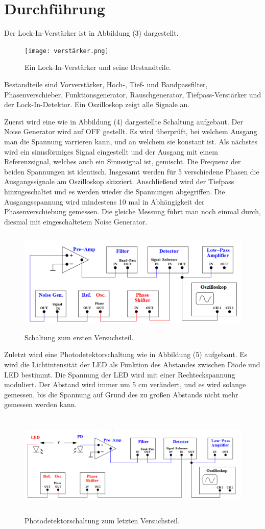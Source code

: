\section{Durchführung}
\label{sec:Durchführung}

Der Lock-In-Verstärker ist in Abbildung (3) dargestellt.

\begin{figure}[H]
  \centering
  \texttt{[image: verstärker.png]}
  \caption{Ein Lock-In-Verstärker und seine Bestandteile.  \cite[S. 3]{l}}
\end{figure}

\noindent Bestandteile sind Vorverstärker, Hoch-, Tief- und Bandpassfilter, Phasenverschieber, Funktionsgenerator, Rauschgenerator, Tiefpass-Verstärker und der Lock-In-Detektor.
Ein Oszilloskop zeigt alle Signale an. 

\noindent Zuerst wird eine wie in Abbildung (4) dargestellte Schaltung aufgebaut. Der Noise Generator wird auf OFF gestellt.
Es wird überprüft, bei welchem Ausgang man die Spannung varrieren kann, und an welchem sie konstant ist.
Als nächstes wird ein sinusförmiges Signal eingestellt und der Ausgang mit einem Referenzsignal, welches auch ein Sinussignal ist, gemischt.
Die Frequenz der beiden Spannungen ist identisch. Insgesamt werden für 5 verschiedene Phasen die Ausgangssignale am Oszilloskop skizziert.
Anschließend wird der Tiefpass hinzugeschaltet und es werden wieder die Spannungen abgegriffen.
Die Ausgangsspannung wird mindestens 10 mal in Abhängigkeit der Phasenverschiebung gemessen.
Die gleiche Messung führt man noch einmal durch, diesmal mit eingeschaltetem Noise Generator.

\begin{figure}[H]
  \centering
  \includegraphics[height=5cm]{aufbau1.png}
  \caption{Schaltung zum ersten Versuchsteil.  \cite[S. 4]{l}}
\end{figure}

\noindent Zuletzt wird eine Photodetektorschaltung wie in Abbildung (5) aufgebaut. 
Es wird die Lichtintensität der LED als Funktion des Abstandes zwischen Diode und LED bestimmt. 
Die Spannung der LED wird mit einer Rechteckspannung moduliert.
Der Abstand wird immer um 5 cm verändert, und es wird solange gemessen, bis die Spannung auf Grund des zu großen Abstands nicht mehr gemessen werden kann.

\begin{figure}[H]
  \centering
  \includegraphics[height=5cm]{aufbau2.png}
  \caption{Photodetektorschaltung zum letzten Versuchsteil.  \cite[S. 5]{l}}
\end{figure}
